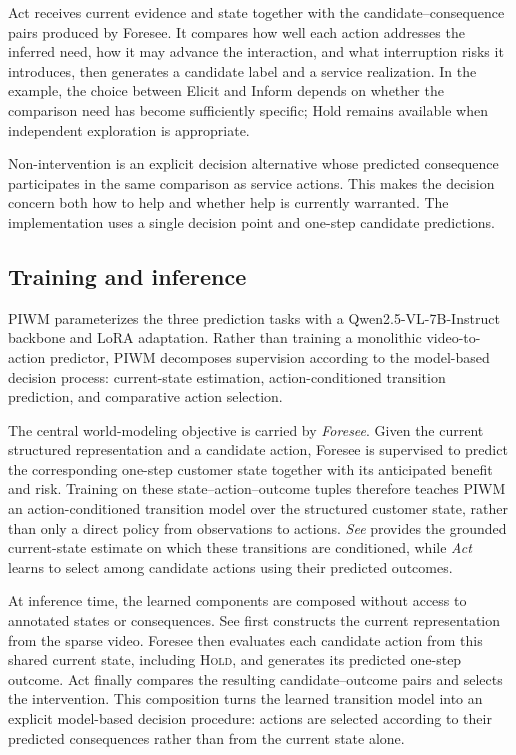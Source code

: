 \documentclass{article}
\begin{document}
Act receives current evidence and state together with the
candidate--consequence pairs produced by Foresee. It compares how well
each action addresses the inferred need, how it may advance the
interaction, and what interruption risks it introduces, then generates a
candidate label and a service realization. In the example, the choice
between Elicit and Inform depends on whether the comparison need has
become sufficiently specific; Hold remains available when independent
exploration is appropriate.

Non-intervention is an explicit decision alternative whose predicted
consequence participates in the same comparison as service actions. This
makes the decision concern both how to help and whether help is
currently warranted. The implementation uses a single decision point and
one-step candidate predictions.

\subsection{Training and inference}\label{training-and-inference}

PIWM parameterizes the three prediction tasks with a
Qwen2.5-VL-7B-Instruct backbone and LoRA adaptation.
Rather than training a monolithic video-to-action predictor, PIWM
decomposes supervision according to the model-based decision process:
current-state estimation, action-conditioned transition prediction, and
comparative action selection.

The central world-modeling objective is carried by \emph{Foresee}.
Given the current structured representation and a candidate action,
Foresee is supervised to predict the corresponding one-step customer
state together with its anticipated benefit and risk. Training on these
state--action--outcome tuples therefore teaches PIWM an
action-conditioned transition model over the structured customer state,
rather than only a direct policy from observations to actions.
\emph{See} provides the grounded current-state estimate on which these
transitions are conditioned, while \emph{Act} learns to select among
candidate actions using their predicted outcomes.

At inference time, the learned components are composed without access
to annotated states or consequences. See first constructs the current
representation from the sparse video. Foresee then evaluates each
candidate action from this shared current state, including \textsc{Hold},
and generates its predicted one-step outcome. Act finally compares the
resulting candidate--outcome pairs and selects the intervention.
This composition turns the learned transition model into an explicit
model-based decision procedure: actions are selected according to their
predicted consequences rather than from the current state alone.
\end{document}

